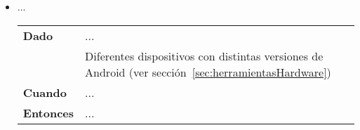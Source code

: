\begin{itemize}
  \item ...

  \begin{tabular}{p{}p{}}
    \hline
    \textbf{Dado}     & ... \\
                      & Diferentes dispositivos con distintas versiones de Android (ver
                        sección~\ref{sec:herramientasHardware}) \\
    \textbf{Cuando}   & ... \\
    \textbf{Entonces} & ... \\
    \hline
  \end{tabular}
\end{itemize}

